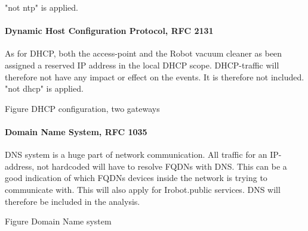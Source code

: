 "not ntp" is applied. 

\paragraph{Dynamic Host Configuration Protocol, RFC 2131}
As for DHCP, both the access-point and the Robot vacuum cleaner as been assigned a reserved IP address in the local DHCP scope. DHCP-traffic will therefore not have any impact or effect on the events. It is therefore not included. "not dhcp" is applied. \cite{rfc2131_dhcp}

Figure DHCP configuration, two gateways

\paragraph{Domain Name System, RFC 1035}
DNS system is a huge part of network communication. All traffic for an IP-address, not hardcoded will have to resolve FQDNs with DNS. This can be a good indication of which FQDNs devices inside the network is trying to communicate with. This will also apply for Irobot.public services. DNS will therefore be included in the analysis. 

Figure Domain Name system

